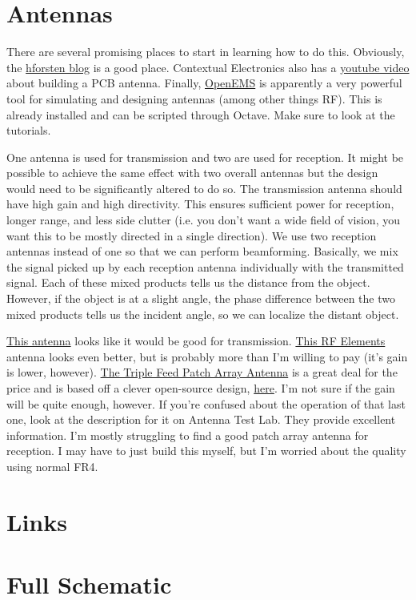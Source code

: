\documentclass{default}
\newcounter{includepdfpage}
\begin{document}
\chapter{Antennas}
\label{cha:antennas}

There are several promising places to start in learning how to do this. Obviously, the
\href{hforsten.com}{hforsten blog} is a good place. Contextual Electronics also has a
\href{https://www.youtube.com/watch?v=m0B-63Q-R_8}{youtube video} about building a PCB
antenna. Finally, \href{http://openems.de/index.php/Main_Page.html}{OpenEMS} is apparently a very
powerful tool for simulating and designing antennas (among other things RF). This is already
installed and can be scripted through Octave. Make sure to look at the tutorials.

One antenna is used for transmission and two are used for reception. It might be possible to achieve
the same effect with two overall antennas but the design would need to be significantly altered to
do so. The transmission antenna should have high gain and high directivity. This ensures sufficient
power for reception, longer range, and less side clutter (i.e. you don't want a wide field of
vision, you want this to be mostly directed in a single direction). We use two reception antennas
instead of one so that we can perform beamforming. Basically, we mix the signal picked up by each
reception antenna individually with the transmitted signal. Each of these mixed products tells us
the distance from the object. However, if the object is at a slight angle, the phase difference
between the two mixed products tells us the incident angle, so we can localize the distant object.

\href{https://assets.lairdtech.com/home/brandworld/files/ANT-DS-PA58\%201115.pdf}{This antenna}
looks like it would be good for
transmission. \href{https://shop.bizsyscon.com/rf-elements-sh-cc-5-30-symmetrical-horn-carrier-class-30-degree.html#horizontalTab1}{This
  RF Elements} antenna looks even better, but is probably more than I'm willing to pay (it's gain is
lower,
however). \href{https://smile.amazon.com/d/Sewing-Machines-Accessories/9-4dBi-Triple-Antenna-Terminator-RJX1749/B074PR4TW3/ref=sr_1_8?ie=UTF8&qid=1544680544&sr=8-8&keywords=patch+antenna}{The
  Triple Feed Patch Array Antenna} is a great deal for the price and is based off a clever
open-source design,
\href{http://www.maartenbaert.be/quadcopters/antennas/triple-feed-patch-array-antenna/}{here}. I'm
not sure if the gain will be quite enough, however. If you're confused about the operation of that
last one, look at the description for it on Antenna Test Lab. They provide excellent
information. I'm mostly struggling to find a good patch array antenna for reception. I may have to
just build this myself, but I'm worried about the quality using normal FR4.

\chapter{Links}
\label{cha:links}


\chapter{Full Schematic}
\label{cha:schematic}


\end{document}
